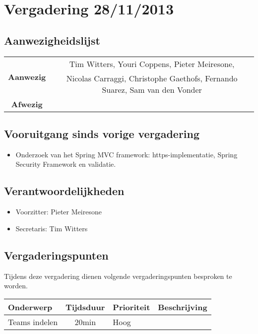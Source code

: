 \section{Vergadering 28/11/2013}
\subsection{Aanwezigheidslijst}
\begin{table}[htbp]
	\centering
	\begin{tabular}{c|c}
		\multirow{2}{*}{\textbf{Aanwezig}} & Tim Witters, Youri Coppens, Pieter Meiresone, \\
		& Nicolas Carraggi,  Christophe Gaethofs, Fernando Suarez, Sam van den Vonder \\
		\hline
		\textbf{Afwezig} & \\
	\end{tabular}
\end{table}

\subsection{Vooruitgang sinds vorige vergadering}
\begin{itemize}
	\item Onderzoek van het Spring MVC framework: https-implementatie, Spring Security Framework en validatie.
\end{itemize}

\subsection{Verantwoordelijkheden}
\begin{itemize}
	\item Voorzitter: Pieter Meiresone
	\item Secretaris: Tim Witters
\end{itemize}
\subsection{Vergaderingspunten}

Tijdens deze vergadering dienen volgende vergaderingspunten besproken te worden.
\begin{table} [H]
	\centering
	\begin{tabular} {l|cll}
		\textbf{Onderwerp} & \textbf{Tijdsduur} & \textbf{Prioriteit} & \textbf{Beschrijving} \\ %
		\hline
		Teams indelen & 20min & Hoog & \\
	\end{tabular}
\end{table}





